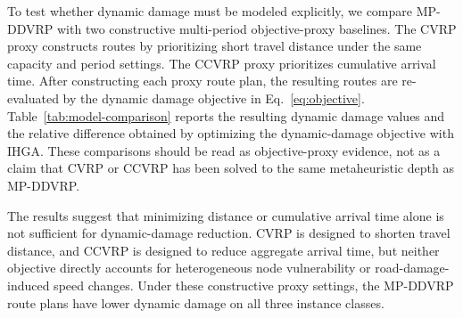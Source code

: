 ﻿\documentclass[preprint,12pt,authoryear]{elsarticle}
\begin{document}
To test whether dynamic damage must be modeled explicitly, we compare MP-DDVRP with two constructive multi-period objective-proxy baselines. The CVRP proxy constructs routes by prioritizing short travel distance under the same capacity and period settings. The CCVRP proxy prioritizes cumulative arrival time. After constructing each proxy route plan, the resulting routes are re-evaluated by the dynamic damage objective in Eq.~\eqref{eq:objective}. Table~\ref{tab:model-comparison} reports the resulting dynamic damage values and the relative difference obtained by optimizing the dynamic-damage objective with IHGA. These comparisons should be read as objective-proxy evidence, not as a claim that CVRP or CCVRP has been solved to the same metaheuristic depth as MP-DDVRP.

\begin{table}[H]
\centering
\caption{Objective-proxy comparison against distance-oriented CVRP and cumulative-arrival-time-oriented CCVRP.}
\label{tab:model-comparison}
\small
{}
\end{table}

The results suggest that minimizing distance or cumulative arrival time alone is not sufficient for dynamic-damage reduction. CVRP is designed to shorten travel distance, and CCVRP is designed to reduce aggregate arrival time, but neither objective directly accounts for heterogeneous node vulnerability or road-damage-induced speed changes. Under these constructive proxy settings, the MP-DDVRP route plans have lower dynamic damage on all three instance classes.

\begin{table}[H]
\centering
\caption{External model comparison on Homberger-derived 100-customer C/R/RC instances.}
\label{tab:model-comparison-extended}
\small
{}
\end{table}
\end{document}
